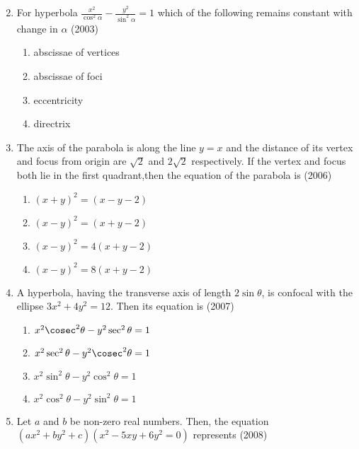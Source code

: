 \begin{enumerate}
\begin{multicols}{4}
\end{multicols}
\item For hyperbola $\frac{x^{2}}{\cos^{2}\alpha}-\frac{y^{2}}{\sin^{2}\alpha}=1$ which of the following remains constant with change in $\alpha$
\hfill{(2003)}
\begin{multicols}{2}
\begin{enumerate}
    \item abscissae of vertices
    \item abscissae of foci
    \item eccentricity
    \item directrix
\end{enumerate}
\end{multicols}
\item The axis of the parabola is along the line $y=x$ and the distance of its vertex and focus from  origin are $\sqrt2$ and $2\sqrt2$  respectively. If the vertex and focus both lie in the first quadrant,then the equation of the parabola is \hfill{(2006)}
\begin{multicols}{2}
\begin{enumerate}
    \item $(x+y)^{2}=(x-y-2)$
    \item $(x-y)^{2}=(x+y-2)$
    \item $(x-y)^{2}=4(x+y-2)$
    \item $(x-y)^{2}=8(x+y-2)$
\end{enumerate}
\end{multicols}
\item A hyperbola, having the transverse axis of length $2\sin\theta$, is confocal with the ellipse $3x^{2}+4y^{2}=12$. Then its equation is \hfill{(2007)}
	\begin{multicols}{2}
\begin{enumerate}
    \item ${x^{2}\cosec^{2}\theta}-{y^{2}\sec^{2}\theta=1}$
    \item $x^{2}\sec^{2}\theta-y^{2}\cosec^{2}\theta=1$
    \item $x^{2}\sin^{2}\theta-y^{2}\cos^{2}\theta=1$
    \item $x^{2}\cos^{2}\theta-y^{2}\sin^{2}\theta=1$
\end{enumerate}\end{multicols}
\item Let $a$ and $b$ be non-zero real numbers. Then, the equation $(ax^{2}+by^{2}+c)(x^{2}-5xy+6y^{2}=0)$ represents \hfill{(2008)}
\begin{enumerate}

\end{enumerate}
\end{enumerate}
